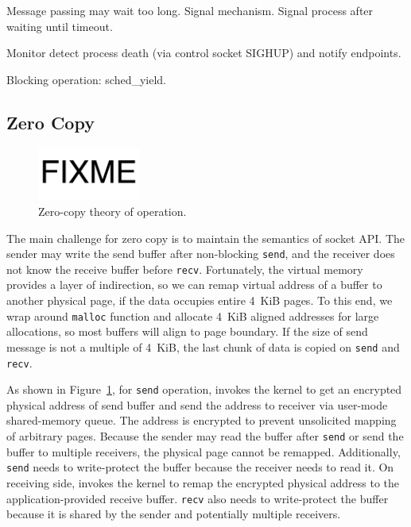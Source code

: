 Message passing may wait too long.
Signal mechanism. Signal process after waiting until timeout.

Monitor detect process death (via control socket SIGHUP) and notify endpoints.

Blocking operation: sched\_yield.


\subsection{Zero Copy}
\label{subsec:zerocopy}

\begin{figure}[t]
	\centering
	\includegraphics[width=0.3\textwidth]{images/fixme}
	\caption{Zero-copy theory of operation.}
	\label{fig:zerocopy}
\end{figure}

The main challenge for zero copy is to maintain the semantics of socket API. The sender may write the send buffer after non-blocking \texttt{send}, and the receiver does not know the receive buffer before \texttt{recv}.
Fortunately, the virtual memory provides a layer of indirection, so we can remap virtual address of a buffer to another physical page, if the data occupies entire 4~KiB pages.
To this end, we wrap around \texttt{malloc} function and allocate 4~KiB aligned addresses for large allocations, so most buffers will align to page boundary.
If the size of send message is not a multiple of 4~KiB, the last chunk of data is copied on \texttt{send} and \texttt{recv}.

As shown in Figure~\ref{fig:zerocopy}, for \texttt{send} operation, \libipc{} invokes the kernel to get an encrypted physical address of send buffer and send the address to receiver via user-mode shared-memory queue.
The address is encrypted to prevent unsolicited mapping of arbitrary pages.
Because the sender may read the buffer after \texttt{send} or send the buffer to multiple receivers, the physical page cannot be remapped.
Additionally, \texttt{send} needs to write-protect the buffer because the receiver needs to read it.
On receiving side, \libipc{} invokes the kernel to remap the encrypted physical address to the application-provided receive buffer.
\texttt{recv} also needs to write-protect the buffer because it is shared by the sender and potentially multiple receivers.

